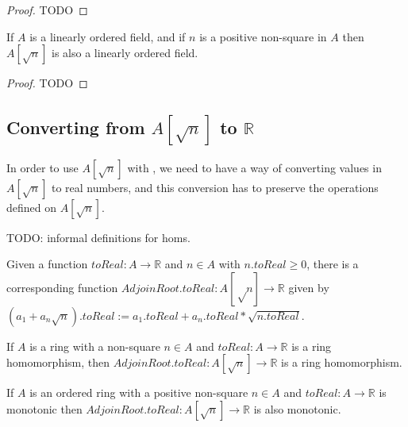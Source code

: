 \begin{proof}
  TODO
\end{proof}


\begin{theorem}
  \label{thm:adjoinOrderedField}

  If $A$ is a linearly ordered field, and if $n$ is a positive non-square in $A$
  then $A[\sqrt{n}]$ is also a linearly ordered field.
\end{theorem}
\begin{proof}
  TODO
\end{proof}

\subsection{Converting from $A[\sqrt{n}]$ to $ℝ$}

In order to use $A[\sqrt{n}]$ with , we need to have a way of
converting values in $A[\sqrt{n}]$ to real numbers, and this conversion has to preserve
the operations defined on $A[\sqrt{n}]$.

TODO: informal definitions for homs.


\begin{definition}
  \label{def:adjoinToReal}
  Given a function $toReal : A → ℝ$ and $n ∈ A$ with $n.toReal \geq 0$,
  there is a corresponding function $AdjoinRoot.toReal : A[√n] → ℝ$ given by
  $(a_1 + a_n\sqrt{n}).toReal := a_1.toReal + a_n.toReal * \sqrt{n.toReal}$.
\end{definition}

\begin{lemma}
  \label{thm:adjoinToRealRingHom}
  If $A$ is a ring with a non-square $n ∈ A$ and $toReal : A → ℝ$ is a
  ring homomorphism, then $AdjoinRoot.toReal : A[\sqrt{n}] → ℝ$ is a ring
  homomorphism.
\end{lemma}

\begin{lemma}
  \label{thm:adjoinToRealOrderHom}
  If $A$ is an ordered ring with a positive non-square $n ∈ A$ and
  $toReal : A → ℝ$ is monotonic then $AdjoinRoot.toReal : A[\sqrt{n}] → ℝ$ is
  also monotonic.
\end{lemma}


